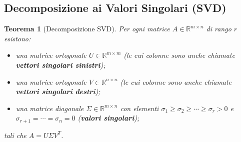 \documentclass[11pt,a4paper]{article}
\theoremstyle{plain}
\newtheorem{teorema}{Teorema}[section]
\theoremstyle{definition}
\theoremstyle{remark}
\begin{document}
\subsection{Decomposizione ai Valori Singolari (SVD)}

\begin{teorema}[Decomposizione SVD]
\label{thm:svd}
Per ogni matrice $A \in \mathbb{R}^{m \times n}$ di rango $r$esistono:
\begin{itemize}
  \item una matrice ortogonale $U \in \mathbb{R}^{m \times m}$ (le cui colonne sono anche chiamate \textbf{vettori singolari sinistri});
  \item una matrice ortogonale $V \in \mathbb{R}^{n \times n}$ (le cui colonne sono anche chiamate \textbf{vettori singolari destri});
  \item una matrice diagonale $\Sigma \in \mathbb{R}^{m \times n}$ con elementi
        $\sigma_1 \geq \sigma_2 \geq \cdots \geq \sigma_{r} > 0$ e $\sigma_{r+1} = \cdots = \sigma_n = 0$
        (\textbf{valori singolari});
\end{itemize}
tali che $A = U \Sigma V^T$. %
\end{teorema}
\end{document}
